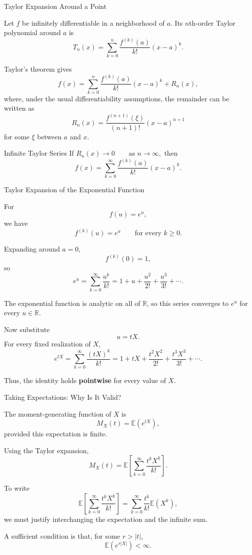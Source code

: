 \begin{frame}{Taylor Expansion Around a Point}

Let \(f\) be infinitely differentiable in a neighborhood of \(a\).
Its \(n\)th-order Taylor polynomial around \(a\) is
\[
T_n(x)
=
\sum_{k=0}^{n}
\frac{f^{(k)}(a)}{k!}(x-a)^k.
\]

Taylor's theorem gives
\[
f(x)
=
\sum_{k=0}^{n}
\frac{f^{(k)}(a)}{k!}(x-a)^k
+
R_n(x),
\]
where, under the usual differentiability assumptions, the remainder can
be written as
\[
R_n(x)
=
\frac{f^{(n+1)}(\xi)}{(n+1)!}(x-a)^{n+1}
\]
for some \(\xi\) between \(a\) and \(x\).

\begin{keybox}{Infinite Taylor Series}
If $R_n(x)\longrightarrow 0
\qquad\text{as }n\to\infty,$ then
\[
f(x)
=
\sum_{k=0}^{\infty}
\frac{f^{(k)}(a)}{k!}(x-a)^k.
\]
\end{keybox}

\end{frame}

\begin{frame}{Taylor Expansion of the Exponential Function}

For
\[
f(u)=e^u,
\]
we have
\[
f^{(k)}(u)=e^u
\qquad\text{for every }k\geq 0.
\]

Expanding around \(a=0\),
\[
f^{(k)}(0)=1,
\]
so
\[
e^u
=
\sum_{k=0}^{\infty}\frac{u^k}{k!}
=
1+u+\frac{u^2}{2!}+\frac{u^3}{3!}+\cdots.
\]

The exponential function is analytic on all of \(\mathbb{R}\), so this
series converges to \(e^u\) for every \(u\in\mathbb{R}\).

Now substitute
\[
u=tX.
\]
For every fixed realization of \(X\),
\[
e^{tX}
=
\sum_{k=0}^{\infty}\frac{(tX)^k}{k!}
=
1+tX+\frac{t^2X^2}{2!}
+\frac{t^3X^3}{3!}+\cdots.
\]

Thus, the identity holds \textbf{pointwise} for every value of \(X\).

\end{frame}

\begin{frame}{Taking Expectations: Why Is It Valid?}

The moment-generating function of \(X\) is
\[
M_X(t)=\mathbb{E}\!\left(e^{tX}\right),
\]
provided this expectation is finite.

Using the Taylor expansion,
\[
M_X(t)
=
\mathbb{E}\left[
\sum_{k=0}^{\infty}\frac{t^kX^k}{k!}
\right].
\]

To write
\[
\mathbb{E}\left[
\sum_{k=0}^{\infty}\frac{t^kX^k}{k!}
\right]
=
\sum_{k=0}^{\infty}
\frac{t^k}{k!}\mathbb{E}(X^k),
\]
we must justify interchanging the expectation and the infinite sum.

A sufficient condition is that, for some \(r>|t|\),
\[
\mathbb{E}\!\left(e^{r|X|}\right)<\infty.
\]
\end{frame}

